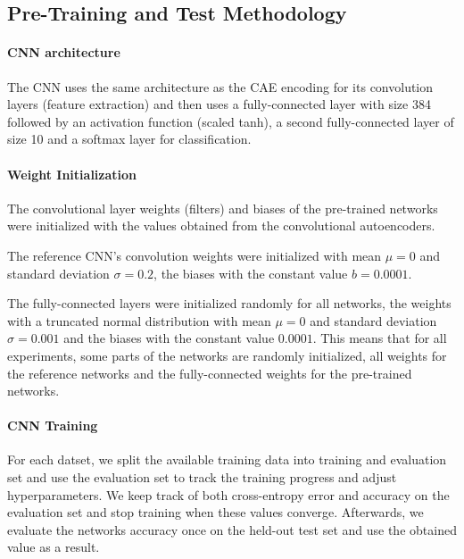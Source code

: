 \documentclass{article}
\begin{document}
  \subsection{Pre-Training and Test Methodology}

    \paragraph{CNN architecture} The CNN uses the same architecture as the CAE encoding for its convolution layers (feature extraction) and then uses a fully-connected layer with size 384 followed by an activation function (scaled tanh), a second fully-connected layer of size 10 and a softmax layer for classification. 

    \paragraph{Weight Initialization}

    The convolutional layer weights (filters) and biases of the pre-trained networks were initialized with the values obtained from the convolutional autoencoders.

    The reference CNN's convolution weights were initialized with mean $\mu = 0 $ and standard deviation $\sigma = 0.2$, the biases with the constant value $b =  0.0001$.

    The fully-connected layers were initialized randomly for all networks, the weights with a truncated normal distribution with mean $\mu = 0$ and standard deviation $\sigma = 0.001$ and the biases with the constant value $0.0001$.
    This means that for all experiments, some parts of the networks are randomly initialized, all weights for the reference networks and the fully-connected weights for the pre-trained networks. 

    \paragraph{CNN Training}
    For each datset, we split the available training data into training and evaluation set and use the evaluation set to track the training progress and adjust hyperparameters. We keep track of both cross-entropy error and accuracy on the evaluation set and stop training when these values converge. Afterwards, we evaluate the networks accuracy once on the held-out test set and use the obtained value as a result. 
\end{document}
